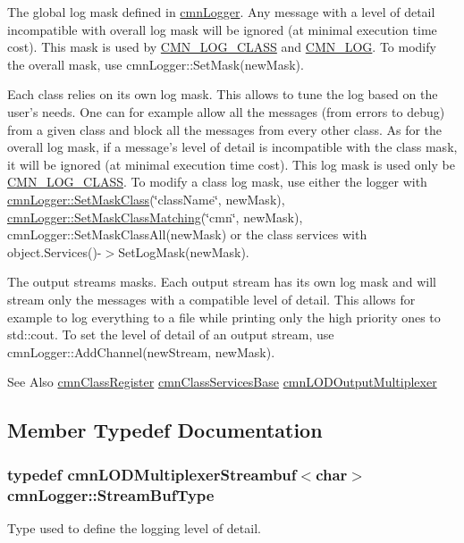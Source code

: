\begin{DoxyItemize}
\item The global log mask defined in \hyperlink{classcmn_logger}{cmn\-Logger}. Any message with a level of detail incompatible with overall log mask will be ignored (at minimal execution time cost). This mask is used by \hyperlink{cmn_logger_8h_a3fa9ee12c1a4d138c2594449aaf23729}{C\-M\-N\-\_\-\-L\-O\-G\-\_\-\-C\-L\-A\-S\-S} and \hyperlink{cmn_logger_8h_a2eb3b40558ec17c9ae45197777aca7b2}{C\-M\-N\-\_\-\-L\-O\-G}. To modify the overall mask, use cmn\-Logger\-::\-Set\-Mask(new\-Mask).
\item Each class relies on its own log mask. This allows to tune the log based on the user's needs. One can for example allow all the messages (from errors to debug) from a given class and block all the messages from every other class. As for the overall log mask, if a message's level of detail is incompatible with the class mask, it will be ignored (at minimal execution time cost). This log mask is used only be \hyperlink{cmn_logger_8h_a3fa9ee12c1a4d138c2594449aaf23729}{C\-M\-N\-\_\-\-L\-O\-G\-\_\-\-C\-L\-A\-S\-S}. To modify a class log mask, use either the logger with \hyperlink{classcmn_logger_ac02d8a05e26687bf66951aab021adad7}{cmn\-Logger\-::\-Set\-Mask\-Class}(\char`\"{}class\-Name\char`\"{}, new\-Mask), \hyperlink{classcmn_logger_ae835d053611487f98a3d216ca8ca6f28}{cmn\-Logger\-::\-Set\-Mask\-Class\-Matching}(\char`\"{}cmn\char`\"{}, new\-Mask), cmn\-Logger\-::\-Set\-Mask\-Class\-All(new\-Mask) or the class services with object.\-Services()-\/$>$Set\-Log\-Mask(new\-Mask).
\item The output streams masks. Each output stream has its own log mask and will stream only the messages with a compatible level of detail. This allows for example to log everything to a file while printing only the high priority ones to std\-::cout. To set the level of detail of an output stream, use cmn\-Logger\-::\-Add\-Channel(new\-Stream, new\-Mask).
\end{DoxyItemize}

\begin{DoxySeeAlso}{See Also}
\hyperlink{classcmn_class_register}{cmn\-Class\-Register} \hyperlink{classcmn_class_services_base}{cmn\-Class\-Services\-Base} \hyperlink{classcmn_l_o_d_output_multiplexer}{cmn\-L\-O\-D\-Output\-Multiplexer} 
\end{DoxySeeAlso}


\subsection{Member Typedef Documentation}
\hypertarget{classcmn_logger_a7d192777882d1dc6bb48ceac0b4e65bb}{
\subsubsection[{Stream\-Buf\-Type}]{\setlength{\rightskip}{0pt plus 5cm}typedef {\bf cmn\-L\-O\-D\-Multiplexer\-Streambuf}$<$char$>$ {\bf cmn\-Logger\-::\-Stream\-Buf\-Type}}}\label{classcmn_logger_a7d192777882d1dc6bb48ceac0b4e65bb}
Type used to define the logging level of detail. 

